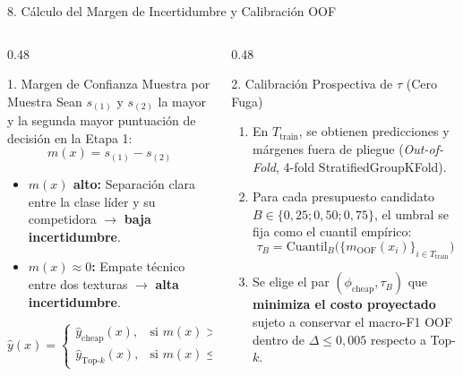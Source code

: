 \documentclass[aspectratio=169,10pt]{beamer}
\begin{document}
\begin{frame}{8. Cálculo del Margen de Incertidumbre y Calibración OOF}
\begin{columns}[T]
\begin{column}{0.48\textwidth}
\begin{block}{1. Margen de Confianza Muestra por Muestra}
Sean $s_{(1)}$ y $s_{(2)}$ la mayor y la segunda mayor puntuación de decisión en la Etapa 1:
\[
m(x) = s_{(1)} - s_{(2)}
\]
\begin{itemize}
\item \textbf{$m(x)$ alto:} Separación clara entre la clase líder y su competidora $\rightarrow$ \textbf{baja incertidumbre}.
\item \textbf{$m(x) \approx 0$:} Empate técnico entre dos texturas $\rightarrow$ \textbf{alta incertidumbre}.
\end{itemize}
\[
\hat{y}(x) =
\begin{cases}
\hat{y}_{\text{cheap}}(x), & \text{si } m(x) > \tau \text{ (Salida Etapa 1)} \\
\hat{y}_{\text{Top-}k}(x), & \text{si } m(x) \le \tau \text{ (Escala a Etapa 2)}
\end{cases}
\]
\end{block}
\end{column}
\begin{column}{0.48\textwidth}
\begin{block}{2. Calibración Prospectiva de $\tau$ (Cero Fuga)}
\begin{enumerate}
\item En $T_{\text{train}}$, se obtienen predicciones y márgenes fuera de pliegue (\emph{Out-of-Fold}, 4-fold StratifiedGroupKFold).
\item Para cada presupuesto candidato $B \in \{0{,}25; 0{,}50; 0{,}75\}$, el umbral se fija como el cuantil empírico:
\[
\tau_B = \text{Cuantil}_B\big(\{m_{\text{OOF}}(x_i)\}_{i \in T_{\text{train}}}\big)
\]
\item Se elige el par $(\phi_{\text{cheap}}, \tau_B)$ que \textbf{minimiza el costo proyectado} sujeto a conservar el macro-F1 OOF dentro de $\Delta \le 0{,}005$ respecto a Top-$k$.
\end{enumerate}
\end{block}
\end{column}
\end{columns}
\end{frame}
\end{document}
